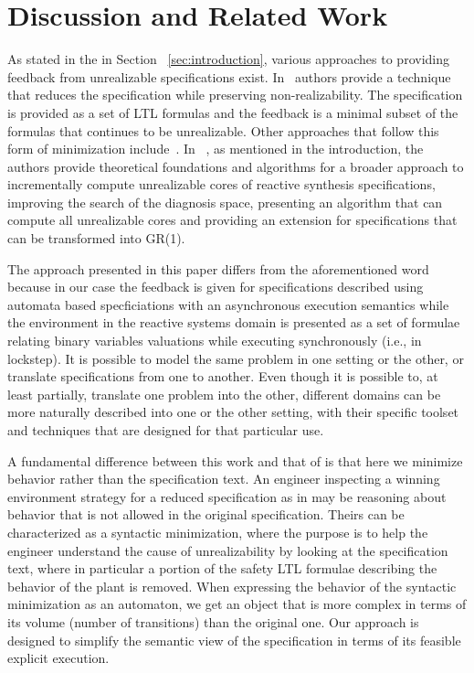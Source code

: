 \section{Discussion and Related Work}\label{sec:discussion}

As stated in the in Section ~\ref{sec:introduction}, various approaches to providing feedback from unrealizable specifications exist. In~\cite{DBLP:conf/fmcad/KonighoferHB09} authors provide a technique that reduces the specification while preserving non-realizability. The specification is provided as a set of LTL formulas and the feedback is a minimal subset of the formulas that continues to be unrealizable. Other approaches that follow this form of minimization include~\cite{DBLP:journals/scp/Schuppan12}. In ~\cite{maoz2021unrealizable}, as mentioned in the introduction, the authors provide theoretical foundations and algorithms for a broader approach to incrementally compute unrealizable cores of reactive synthesis specifications, improving the search of the diagnosis space, presenting an algorithm that can compute all unrealizable cores and providing an extension for specifications that can be transformed into GR(1).
 
The approach presented in this paper differs from the aforementioned word because in our case the feedback is given for specifications described using automata based specficiations with an asynchronous execution semantics while the environment in the reactive systems domain is presented as a set of formulae relating binary variables valuations while executing synchronously (i.e., in lockstep). It is possible to model the same problem in one setting or the other, or translate specifications from one to another.  Even though it is possible to, at least partially, translate one problem into the other, different domains can be more naturally described into one or the other setting, with their specific toolset and techniques that are designed for that particular use.

A fundamental difference between this work and that of \cite{DBLP:conf/fmcad/KonighoferHB09} is that here we minimize behavior rather than the specification text. An engineer inspecting a winning environment strategy for a reduced specification as in \cite{DBLP:conf/fmcad/KonighoferHB09} may be reasoning about behavior that is not allowed in the original specification.  Theirs can be characterized as a syntactic minimization, where the purpose is to help the engineer understand the cause of unrealizability by looking at the specification text, where in particular a portion of the safety LTL formulae describing the behavior of the plant is removed. 
When expressing the behavior of the syntactic minimization as an automaton, we get an object that is more complex in terms of its volume (number of transitions) than the original one. 
Our approach is designed to simplify the semantic view of the specification in terms of its feasible explicit execution.

